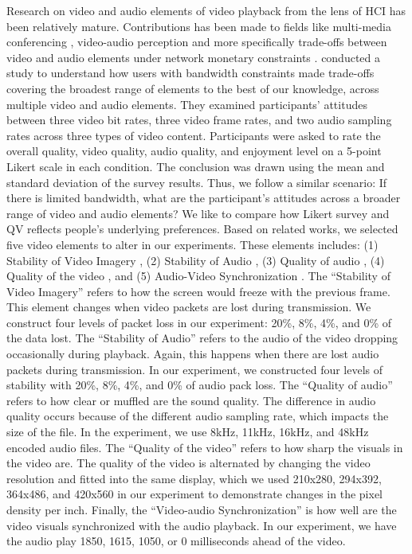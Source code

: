 Research on video and audio elements of video playback from the lens of HCI has been relatively mature.
Contributions has been made to fields like multi-media conferencing \cite{watson1996evaluating}, video-audio perception \cite{chen2006cognitive, molnar2015assessing}and more specifically trade-offs between video and audio elements under network monetary constraints \cite{molnar2013comedy, oeldorf2012bad}.
\textcite{oeldorf2012bad} conducted a study to understand how users with bandwidth constraints made trade-offs covering the broadest range of elements to the best of our knowledge, across multiple video and audio elements. 
They examined participants' attitudes between three video bit rates, three video frame rates, and two audio sampling rates across three types of video content.
Participants were asked to rate the overall quality, video quality, audio quality, and enjoyment level on a 5-point Likert scale in each condition. 
The conclusion was drawn using the mean and standard deviation of the survey results.
Thus, we follow a similar scenario: 
If there is limited bandwidth, what are the participant's attitudes across a broader range of video and audio elements?
We like to compare how Likert survey and QV reflects people's underlying preferences. 
Based on related works, we selected five video elements to alter in our experiments. 
These elements includes: (1) Stability of Video Imagery \cite{claypool1999effects}, (2) Stability of Audio \cite{claypool1999effects}, (3) Quality of audio \cite{oeldorf2012bad, noll1993wideband}, (4) Quality of the video \cite{oeldorf2012bad, knoche2008low}, and (5) Audio-Video Synchronization \cite{steinmetz1996human}. 
The ``Stability of Video Imagery'' refers to how the screen would freeze with the previous frame. 
This element changes when video packets are lost during transmission. 
We construct four levels of packet loss in our experiment: 20\%, 8\%, 4\%, and 0\% of the data lost. 
The ``Stability of Audio'' refers to the audio of the video dropping occasionally during playback. 
Again, this happens when there are lost audio packets during transmission. 
In our experiment, we constructed four levels of stability with 20\%, 8\%, 4\%, and 0\% of audio pack loss. 
The ``Quality of audio'' refers to how clear or muffled are the sound quality. 
The difference in audio quality occurs because of the different audio sampling rate, which impacts the size of the file. 
In the experiment, we use 8kHz, 11kHz, 16kHz, and 48kHz encoded audio files. 
The ``Quality of the video'' refers to how sharp the visuals in the video are.
The quality of the video is alternated by changing the video resolution and fitted into the same display, which we used 210x280, 294x392, 364x486, and 420x560 in our experiment to demonstrate changes in the pixel density per inch.
Finally, the ``Video-audio Synchronization'' is how well are the video visuals synchronized with the audio playback.
In our experiment, we have the audio play 1850, 1615, 1050, or 0 milliseconds ahead of the video.

